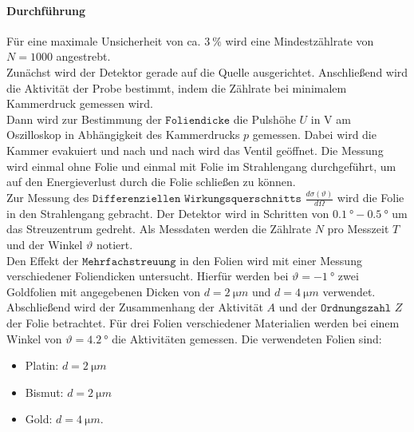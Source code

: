 \paragraph{Durchführung}
Für eine maximale Unsicherheit von ca. $\SI{3}{\%}$ wird eine Mindestzählrate von  $N=1000$ angestrebt.
\\Zunächst wird der Detektor gerade auf die Quelle ausgerichtet.
Anschließend wird die Aktivität der Probe bestimmt, indem die Zählrate bei minimalem Kammerdruck gemessen wird.
\\Dann wird zur Bestimmung der $\texttt{Foliendicke}$ die Pulshöhe $U$ in V am Oszilloskop in Abhängigkeit des Kammerdrucks $p$ gemessen.
Dabei wird die Kammer evakuiert und nach und nach wird das Ventil geöffnet.
Die Messung wird einmal ohne Folie und einmal mit Folie im Strahlengang durchgeführt, um auf den Energieverlust durch die Folie schließen zu können.
\\Zur Messung des $\texttt{Differenziellen Wirkungsquerschnitts}$ $\displaystyle{ \frac{d\sigma (\vartheta)}{d\Omega}}$ wird die Folie in den Strahlengang gebracht.
Der Detektor wird in Schritten von $\SI{0.1}{°} - \SI{0.5}{°}$ um das Streuzentrum gedreht.
Als Messdaten werden die Zählrate $N$ pro Messzeit $T$ und der Winkel $\vartheta$ notiert.
\\Den Effekt der $\texttt{Mehrfachstreuung}$ in den Folien wird mit einer Messung verschiedener Foliendicken untersucht.
Hierfür werden bei $\vartheta = \SI{-1}{°}$ zwei Goldfolien mit angegebenen Dicken von $d=\SI{2}{\micro m}$ und $d = \SI{4}{\micro m}$ verwendet.
\\Abschließend wird der Zusammenhang der Aktivität $A$ und der $\texttt{Ordnungszahl}$ $Z$ der Folie betrachtet.
Für drei Folien verschiedener Materialien werden bei einem Winkel von $\vartheta = \SI{4.2}{°}$ die Aktivitäten gemessen.
Die verwendeten Folien sind:
\begin{itemize}
	\item Platin: $d=\SI{2}{\micro m}$
	\item Bismut: $d=\SI{2}{\micro m}$
	\item Gold: $d=\SI{4}{\micro m}$.
\end{itemize}
%
%
